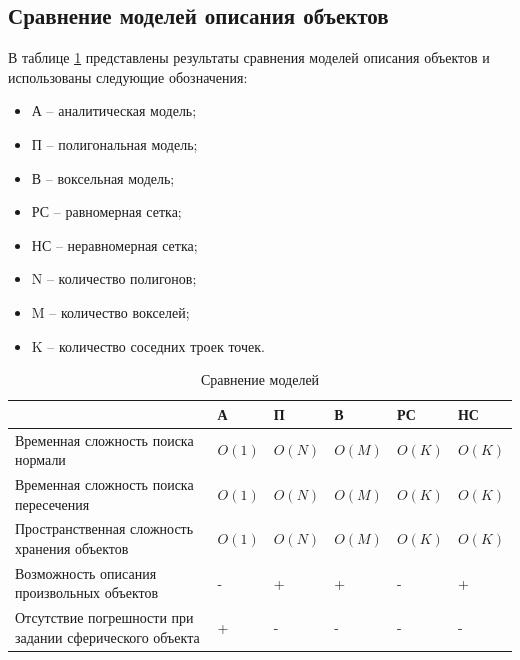\subsection{Сравнение моделей описания объектов}

В таблице \ref{tbl:comparing_mod} представлены результаты сравнения моделей описания объектов и использованы следующие обозначения:

\begin{itemize}[label=---]
    \item А -- аналитическая модель;
    \item П -- полигональная модель;
    \item В -- воксельная модель;
    \item РС -- равномерная сетка;
    \item НС -- неравномерная сетка;
    \item N -- количество полигонов;
    \item M -- количество вокселей;
    \item K -- количество соседних троек точек.
\end{itemize}

\begin{table}[H]
	\begin{center}
        \small
		\caption{Сравнение моделей}
		\label{tbl:comparing_mod}
		\begin{tabular}{
              |m{3.4in}|
              >{\centering\arraybackslash}m{0.4in}|
              >{\centering\arraybackslash}m{0.4in}|
              >{\centering\arraybackslash}m{0.4in}|
              >{\centering\arraybackslash}m{0.4in}|
              >{\centering\arraybackslash}m{0.4in}|
              }
			 \hline
              & А & П & В & РС & НС \\
             \hline
             Временная сложность поиска нормали & $O(1)$ & $O(N)$ & $O(M)$ & $O(K)$ & $O(K)$ \\
             \hline
             Временная сложность поиска пересечения & $O(1)$ & $O(N)$ & $O(M)$ & $O(K)$ & $O(K)$ \\
             \hline
             Пространственная сложность хранения объектов & $O(1)$ & $O(N)$ & $O(M)$ & $O(K)$ & $O(K)$ \\
             \hline
             Возможность описания произвольных объектов & - & + & + & - & + \\
             \hline
             Отсутствие погрешности при задании сферического объекта & + & - & - & - & - \\
             \hline
		\end{tabular}
	\end{center}
\end{table}

